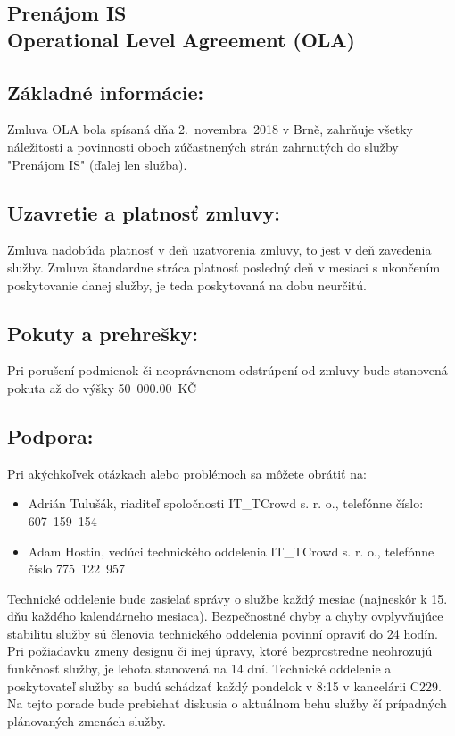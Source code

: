 \documentclass[a4paper, 11pt]{article}
\begin{document}
\begin{center}
\hfill
\section*{ \Large Prenájom IS \\ Operational Level Agreement (OLA)}
\hfill
\subsection*{Základné informácie:}
Zmluva OLA bola spísaná dňa 2.~novembra~2018 v Brně, zahrňuje všetky náležitosti a povinnosti oboch zúčastnených strán zahrnutých do služby "Prenájom IS" (ďalej len služba).

\subsection*{Uzavretie a platnosť zmluvy:}
Zmluva nadobúda platnosť v deň uzatvorenia zmluvy, to jest v deň zavedenia služby. Zmluva štandardne stráca platnosť posledný deň v mesiaci s ukončením poskytovanie danej služby, je teda poskytovaná na dobu neurčitú. 

\subsection*{Pokuty a prehrešky:}
Pri porušení podmienok či neoprávnenom odstrúpení od zmluvy bude stanovená pokuta až do výšky 50~000.00~KČ

\subsection*{Podpora:}
Pri akýchkoľvek otázkach alebo problémoch sa môžete obrátiť na:
\begin{itemize}
\item Adrián Tulušák, riaditeľ spoločnosti IT\_TCrowd s. r. o., telefónne číslo: 607~159~154
\item Adam Hostin, vedúci technického oddelenia IT\_TCrowd s. r. o., telefónne číslo 775~122~957
\end{itemize}
Technické oddelenie bude zasielať správy o službe každý mesiac (najneskôr k 15. dňu každého kalendárneho mesiaca). Bezpečnostné chyby a chyby ovplyvňujúce stabilitu služby sú členovia technického oddelenia povinní opraviť do 24 hodín. Pri požiadavku zmeny designu či inej úpravy, ktoré bezprostredne neohrozujú funkčnosť služby, je lehota stanovená na 14 dní. Technické oddelenie a poskytovateľ služby sa budú schádzať každý pondelok v 8:15 v kancelárii C229. Na tejto porade bude prebiehať diskusia o aktuálnom behu služby čí prípadných plánovaných zmenách služby.


\end{center}
\end{document}
